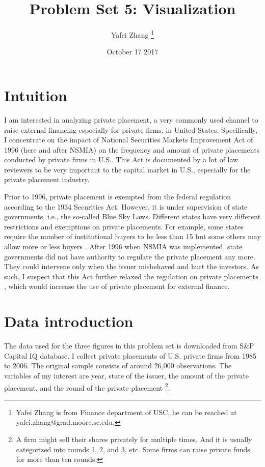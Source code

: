 \documentclass[letterpaper,12pt]{article}
\title{Problem Set 5: Visualization}
\author{Yafei Zhang \thanks{Yafei Zhang is from Finance department of USC, he can be reached at yafei.zhang@grad.moore.sc.edu.}}
\date{October 17 2017}
\theoremstyle{definition}
\begin{document}
\maketitle

\vspace{5mm}

\section{Intuition}

I am interested in analyzing private placement, a very commonly used channel to raise external financing especially for private firms, in United States. Specifically, I concentrate on the impact of National Securities Markets Improvement Act of 1996 (here and after NSMIA) on the frequency and amount of private placements conducted by private firms in U.S.. This Act is documented by a lot of law reviewers to be very important to the capital market in U.S., especially for the private placement industry.

Prior to 1996, private placement is exempted from the federal regulation according to the 1934 Securities Act. However, it is under supervision of state governments, i.e., the so-called Blue Sky Laws. Different states have very different restrictions and exemptions on private placements. For example, some states require the number of institutional buyers to be less than 15 but some others may allow more or less buyers \cite{royalty1976private}. After 1996 when NSMIA was implemented, state governments did not have authority to regulate the private placement any more. They could intervene only when the issuer misbehaved and hurt the investors. As such, I suspect that this Act further relaxed the regulation on private placements \cite{johnson2010private}, which would increase the use of private placement for external finance.


\section{Data introduction}

The data used for the three figures in this problem set is downloaded from S\&P Capital IQ database. I collect private placements of U.S. private firms from 1985 to 2006. The original sample consists of around 26,000 observations. The variables of my interest are year, state of the issuer, the amount of the private placement, and the round of the private placement \footnote{A firm might sell their shares privately for multiple times. And it is usually categorized into rounds 1, 2, and 3, etc. Some firms can raise private funds for more than ten rounds.}.
\end{document}

